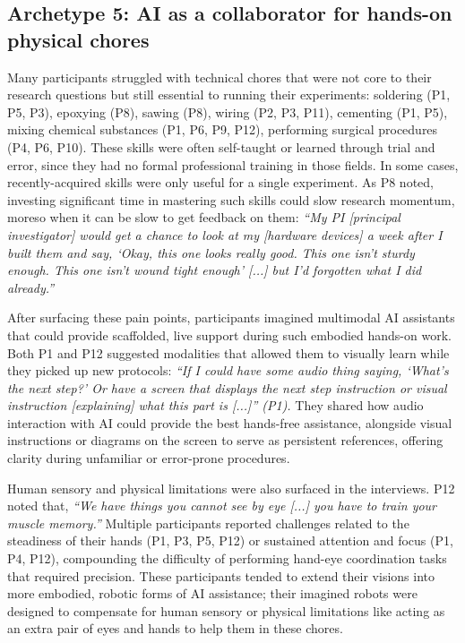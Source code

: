 \subsection{\textbf{Archetype 5: AI as a collaborator for hands-on physical chores}} Many participants struggled with technical chores that were not core to their research questions but still essential to running their experiments: soldering (P1, P5, P3), epoxying (P8), sawing (P8), wiring (P2, P3, P11), cementing (P1, P5), mixing chemical substances (P1, P6, P9, P12), performing surgical procedures (P4, P6, P10). These skills were often self-taught or learned through trial and error, since they had no formal professional training in those fields. In some cases, recently-acquired skills were only useful for a single experiment. As P8 noted, investing significant time in mastering such skills could slow research momentum, moreso when it can be slow to get feedback on them: \textit{``My PI [principal investigator] would get a chance to look at my [hardware devices] a week after I built them and say, `Okay, this one looks really good. This one isn't sturdy enough. This one isn't wound tight enough' [...] but I'd forgotten what I did already.''}

After surfacing these pain points, participants imagined multimodal AI assistants that could provide scaffolded, live support during such embodied hands-on work. Both P1 and P12 suggested modalities that allowed them to visually learn while they picked up new protocols: \textit{``If I could have some audio thing saying, `What's the next step?' Or have a screen that displays the next step instruction or visual instruction [explaining] what this part is [...]'' (P1).} They shared how audio interaction with AI could provide the best hands-free assistance, alongside visual instructions or diagrams on the screen to serve as persistent references, offering clarity during unfamiliar or error-prone procedures.

Human sensory and physical limitations were also surfaced in the interviews. P12 noted that, \textit{``We have things you cannot see by eye [...] you have to train your muscle memory.''} Multiple participants reported challenges related to the steadiness of their hands (P1, P3, P5, P12) or sustained attention and focus (P1, P4, P12), compounding the difficulty of performing hand-eye coordination tasks that required precision. These participants tended to extend their visions into more embodied, robotic forms of AI assistance; their imagined robots were designed to compensate for human sensory or physical limitations like acting as an extra pair of eyes and hands to help them in these chores.

